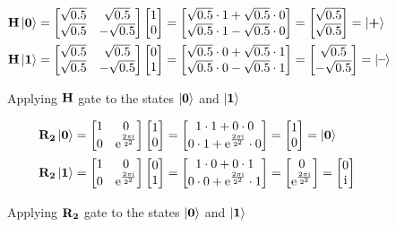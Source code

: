 \begin{figure}[H]
    \centering
    \begin{align*}
        \qth\ket{\qtz}&=\qh\qz=
        \begin{bmatrix}
            \sqrt{0.5} \cdot 1 + \sqrt{0.5} \cdot 0\\
            \sqrt{0.5} \cdot 1 - \sqrt{0.5} \cdot 0\\
        \end{bmatrix}=
        \qp=\ket{\qtp}\\
        \qth\ket{\qto}&=\qh\qo=
        \begin{bmatrix}
            \sqrt{0.5} \cdot 0 + \sqrt{0.5} \cdot 1\\
            \sqrt{0.5} \cdot 0 - \sqrt{0.5} \cdot 1\\
        \end{bmatrix}=
        \qm=\ket{\qtm}
    \end{align*}
    \caption{Applying $\qth$ gate to the states $\ket{\qtz}$ and $\ket{\qto}$}
    \label{fig:app_h}
\end{figure}

\begin{figure}[H]
    \centering
    \begin{align*}
        \qtr{2}\ket{\qtz}&=\qr{2}\qz=
        \begin{bmatrix}
            1 \cdot 1 + 0 \cdot 0\\
            0 \cdot 1 + \qre{2} \cdot 0\\
        \end{bmatrix}=
        \qz=\ket{\qtz}\\
        \qtr{2}\ket{\qto}&=\qr{2}\qo=
        \begin{bmatrix}
            1 \cdot 0 + 0 \cdot 1\\
            0 \cdot 0 + \qre{2} \cdot 1\\
        \end{bmatrix}=
        \begin{bmatrix}
            0\\
            \qre{2}\\
        \end{bmatrix}=
        \begin{bmatrix}
            0\\
            \mathrm{i}\\
        \end{bmatrix}
    \end{align*}
    \caption{Applying $\qtr{2}$ gate to the states $\ket{\qtz}$ and $\ket{\qto}$}
    \label{fig:app_r2}
\end{figure}

